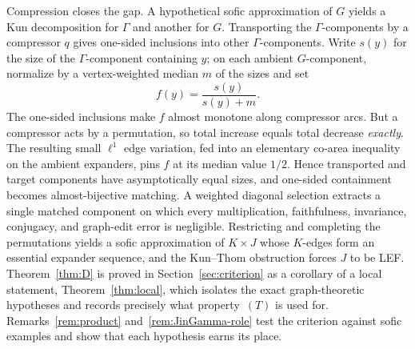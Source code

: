 \documentclass[11pt]{amsart}
\theoremstyle{definition}
\theoremstyle{plain}
\begin{document}
Compression closes the gap.  A hypothetical sofic approximation of \(G\) yields a Kun decomposition for \(\Gamma\) and another for \(G\).  Transporting the \(\Gamma\)-components by a compressor \(q\) gives one-sided inclusions into other \(\Gamma\)-components.  Write \(s(y)\) for the size of the \(\Gamma\)-component containing \(y\); on each ambient \(G\)-component, normalize by a vertex-weighted median \(m\) of the sizes and set
\begin{equation}\label{eq:median-intro}
 f(y)=\frac{s(y)}{s(y)+m}.
\end{equation}
The one-sided inclusions make \(f\) almost monotone along compressor arcs.  But a compressor acts by a permutation, so total increase equals total decrease \emph{exactly}.  The resulting small \(\ell^1\) edge variation, fed into an elementary co-area inequality on the ambient expanders, pins \(f\) at its median value \(1/2\).  Hence transported and target components have asymptotically equal sizes, and one-sided containment becomes almost-bijective matching.  A weighted diagonal selection extracts a single matched component on which every multiplication, faithfulness, invariance, conjugacy, and graph-edit error is negligible.  Restricting and completing the permutations yields a sofic approximation of \(K\times J\) whose \(K\)-edges form an essential expander sequence, and the Kun--Thom obstruction forces \(J\) to be LEF\@.  Theorem~\ref{thm:D} is proved in Section~\ref{sec:criterion} as a corollary of a local statement, Theorem~\ref{thm:local}, which isolates the exact graph-theoretic hypotheses and records precisely what property~\((T)\) is used for.  Remarks~\ref{rem:product} and~\ref{rem:JinGamma-role} test the criterion against sofic examples and show that each hypothesis earns its place.
\end{document}
